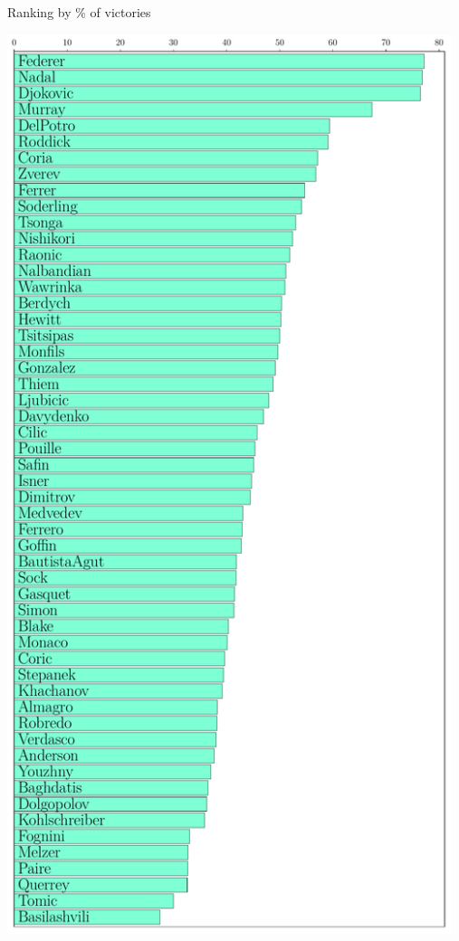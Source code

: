 \documentclass{beamer}
\begin{document}
\begin{frame}[t]{Ranking by \% of victories}
	\grid

	\vspace{-1.0cm}
	\begin{center}
		\hspace*{-1.1cm}
		\includegraphics[width=13cm]{../st_tennis.pdf}
	\end{center}
\end{frame}
\end{document}
